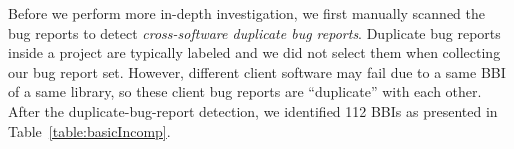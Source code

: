 





Before we perform more in-depth investigation, we first manually scanned the bug reports to detect \textit{cross-software duplicate bug reports}. Duplicate bug reports inside a project are typically labeled and we did not select them when collecting our bug report set. However, different client software may fail due to a same BBI of a same library, so these client bug reports are ``duplicate'' with each other. After the duplicate-bug-report detection, we identified 112 BBIs as presented in Table~\ref{table:basicIncomp}. 

